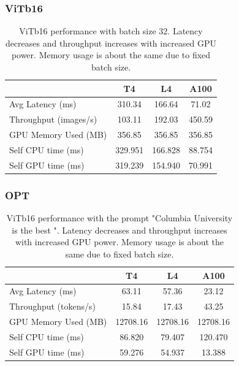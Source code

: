 \documentclass[11pt]{article}
\begin{document}
\subsubsection*{ViTb16}
\begin{table}[h]
    \centering
    \begin{tabular}{lccc}
        \toprule
        & T4 & L4 & A100 \\
        \midrule
        Avg Latency (ms) & 310.34 & 166.64 & 71.02 \\
        Throughput (images/s) & 103.11 & 192.03 & 450.59 \\
        GPU Memory Used (MB) & 356.85 & 356.85 & 356.85 \\
        Self CPU time (ms) & 329.951 & 166.828 & 88.754 \\
        Self GPU time (ms) & 319.239 & 154.940 & 70.991 \\
        \bottomrule
    \end{tabular}
    \caption{ViTb16 performance with batch size 32. Latency decreases and throughput increases with increased GPU power. Memory usage is about the same due to fixed batch size.}
    \label{tab:gpu_comparison}
\end{table}

\subsubsection*{OPT}

\begin{table}[h]
    \centering
    \begin{tabular}{lccc}
        \toprule
        & T4 & L4 & A100 \\
        \midrule
        Avg Latency (ms) & 63.11 & 57.36 & 23.12 \\
        Throughput (tokens/s) & 15.84 & 17.43 & 43.25 \\
        GPU Memory Used (MB) & 12708.16 & 12708.16 & 12708.16 \\
        Self CPU time (ms) & 86.820 & 79.407 & 120.470 \\
        Self GPU time (ms) & 59.276 & 54.937 & 13.388 \\
        \bottomrule
    \end{tabular}
    \caption{ViTb16 performance with the prompt "Columbia University is the best ". Latency decreases and throughput increases with increased GPU power. Memory usage is about the same due to fixed batch size.}
    \label{tab:gpu_comparison}
\end{table}
\end{document}
